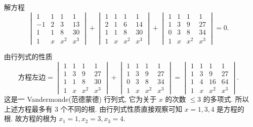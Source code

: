 \documentclass[../../main.tex]{subfiles}
\begin{document}
\begin{example}
解方程
\[
\begin{vmatrix} 1 & 1 & 1 & 1 \\ -1 & 2 & 3 & 13 \\ 1 & 1 & 8 & 30 \\ 1 & x & x^2 & x^3 \end{vmatrix} + \begin{vmatrix} 1 & 1 & 1 & 1 \\ 2 & 1 & 6 & 14 \\ 1 & 1 & 8 & 30 \\ 1 & x & x^2 & x^3 \end{vmatrix} + \begin{vmatrix} 1 & 1 & 1 & 1 \\ 1 & 3 & 9 & 27 \\ 0 & 3 & 8 & 34 \\ 1 & x & x^2 & x^3 \end{vmatrix} = 0.
\]
\end{example}
\begin{solution}
由行列式的性质
\[
\text{方程左边} = \begin{vmatrix} 1 & 1 & 1 & 1 \\ 1 & 3 & 9 & 27 \\ 1 & 1 & 8 & 30 \\ 1 & x & x^2 & x^3 \end{vmatrix} + \begin{vmatrix} 1 & 1 & 1 & 1 \\ 1 & 3 & 9 & 27 \\ 0 & 3 & 8 & 34 \\ 1 & x & x^2 & x^3 \end{vmatrix} = \begin{vmatrix} 1 & 1 & 1 & 1 \\ 1 & 3 & 9 & 27 \\ 1 & 4 & 16 & 64 \\ 1 & x & x^2 & x^3 \end{vmatrix}.
\]
这是一 Vandermonde(范德蒙德) 行列式, 它为关于 \(x\) 的次数 \(\leqslant 3\) 的多项式. 所以上述方程最多有 \(3\) 个不同的根. 由行列式性质直接观察可知 \(x = 1, 3, 4\) 是方程的根. 故方程的根为 \(x_1 = 1, x_2 = 3, x_3 = 4\).
\end{solution}
\end{document}
